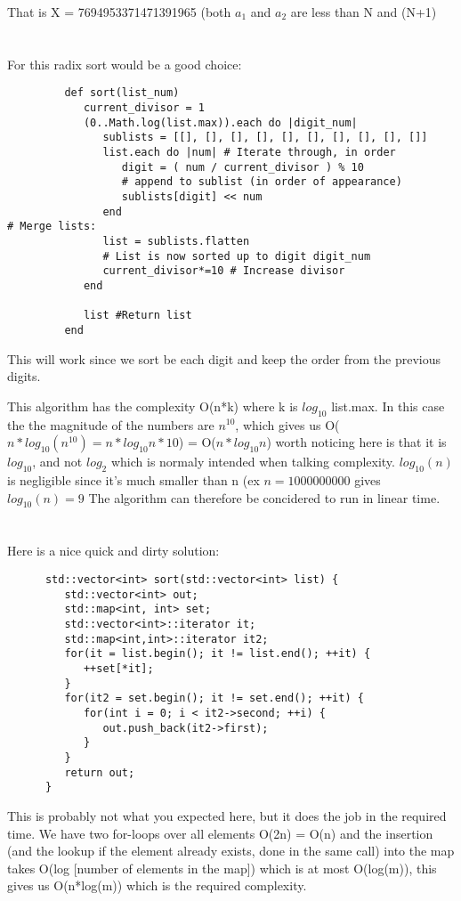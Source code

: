 \documentclass[a4paper,11pt]{article}
\begin{document}
		That is X = 7694953371471391965 (both $a_1$ and $a_2$ are less than N and (N+1)


	\section{}
		For this radix sort would be a good choice:

		\begin{verbatim}
         def sort(list_num) 
            current_divisor = 1
            (0..Math.log(list.max)).each do |digit_num|
               sublists = [[], [], [], [], [], [], [], [], [], []]
               list.each do |num| # Iterate through, in order
                  digit = ( num / current_divisor ) % 10
                  # append to sublist (in order of appearance)
                  sublists[digit] << num 
               end
# Merge lists:
               list = sublists.flatten
               # List is now sorted up to digit digit_num
               current_divisor*=10 # Increase divisor
            end

            list #Return list
         end
		\end{verbatim}

		This will work since we sort be each digit and keep the order from the previous digits.

		This algorithm has the complexity O(n*k) where k is $log_{10} $ list.max. In this case the the magnitude of the numbers are $n^{10}$, which gives us O($n*log_{10}(n^{10}) = n*log_{10}n * 10$) = O($n * log_{10} n$) worth noticing here is that it is $log_{10}$, and not $log_2$ which is normaly intended when talking complexity. $log_{10}(n)$ is negligible since it's much smaller than n (ex $ n = 1 000 000 000 $ gives $ log_{10}(n) = 9$ The algorithm can therefore be concidered to run in linear time.

	\section{}
		Here is a nice quick and dirty solution:\\
		\begin{verbatim}
      std::vector<int> sort(std::vector<int> list) {
         std::vector<int> out;
         std::map<int, int> set;
         std::vector<int>::iterator it;
         std::map<int,int>::iterator it2;
         for(it = list.begin(); it != list.end(); ++it) {
            ++set[*it];
         }
         for(it2 = set.begin(); it != set.end(); ++it) {
            for(int i = 0; i < it2->second; ++i) {
               out.push_back(it2->first);
            }
         }
         return out;
      }
		\end{verbatim}

		This is probably not what you expected here, but it does the job in the required time. We have two for-loops over all elements O(2n) = O(n) and the insertion (and the lookup if the element already exists, done in the same call) into the map takes O(log [number of elements in the map]) which is at most O(log(m)), this gives us O(n*log(m)) which is the required complexity.
\end{document}
